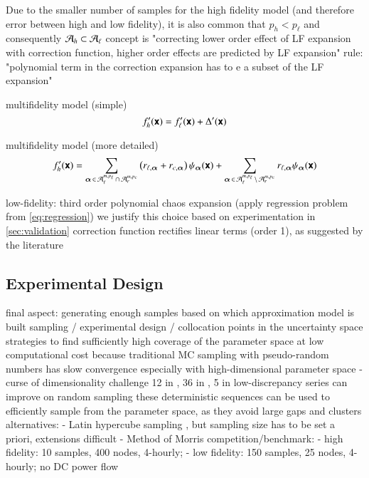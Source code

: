 Due to the smaller number of samples for the high fidelity model (and therefore error between high and low fidelity), it is also
common that $p_h < p_\ell$ and consequently $\mathcal{A}_h \subset \mathcal{A}_\ell$
concept is "correcting lower order effect of LF expansion with correction function, higher order effects are predicted by LF expansion" \cite{palar_multi-fidelity_2016}
rule: "polynomial term in the correction expansion has to e a subset of the LF expansion" \cite{palar_multi-fidelity_2016}

multifidelity model (simple)
\begin{equation}
    f_h'(\boldsymbol{\mathsf{x}}) = f_\ell'(\boldsymbol{\mathsf{x}}) + \Delta'(\boldsymbol{\mathsf{x}})
\end{equation}

multifidelity model (more detailed)
\begin{equation}
    f_h' (\boldsymbol{\mathsf{x}}) = \sum_{{\bm{\alpha}}\,\in\,\mathcal{A}_\ell^{m,p_\ell} \,\cap\, \mathcal{A}_r^{m,p_c}}
    \left(
     r_{\ell,{\bm{\alpha}}} + r_{c,{\bm{\alpha}}}
    \right) \psi_{\bm{\alpha}}(\boldsymbol{\mathsf{x}}) + 
    \sum_{{\bm{\alpha}}\,\in\,\mathcal{A}_\ell^{m,p_\ell} \,\setminus\, \mathcal{A}_r^{m,p_c}}
    r_{\ell,{\bm{\alpha}}} \psi_{\bm{\alpha}}(\boldsymbol{\mathsf{x}})
\end{equation}


low-fidelity: third order polynomial chaos expansion (apply regression problem from \cref{eq:regression})
we justify this choice based on experimentation in \cref{sec:validation}
correction function rectifies linear terms (order 1), as suggested by the literature

\subsection{Experimental Design}
\label{sec:sampling}


final aspect: generating enough samples based on which approximation model is built
sampling / experimental design / collocation points in the uncertainty space
strategies to find sufficiently high coverage of the parameter space at low computational cost \cite{fajraoui_optimal_2017,usher_value_2015}
because traditional MC sampling with pseudo-random numbers has slow convergence %
especially with high-dimensional parameter space - curse of dimensionality challenge
12 in \cite{trondle_trade-offs_2020}, 36 in \cite{pilpola_analyzing_2020}, 5 in \cite{shirizadeh_how_2019}
low-discrepancy series can improve on random sampling
these deterministic sequences can be used to efficiently sample from the parameter space, as they avoid large gaps and clusters \cite{fajraoui_optimal_2017}
alternatives:
- Latin hypercube sampling \cite{trondle_trade-offs_2020}, but sampling size has to be set a priori, extensions difficult \cite{fajraoui_optimal_2017}
- Method of Morris \cite{usher_value_2015,mavromatidis_uncertainty_2018}
competition/benchmark: \cite{trondle_trade-offs_2020}
- high fidelity: 10 samples, 400 nodes, 4-hourly;
- low fidelity: 150 samples, 25 nodes, 4-hourly; no DC power flow

